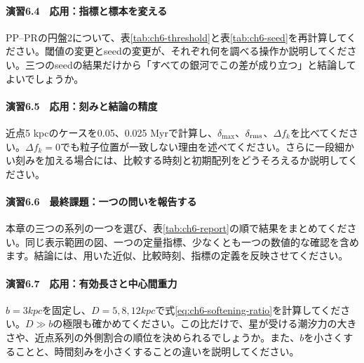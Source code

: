 \paragraph{演習6.4　応用：指標と標本を変える}
PP--PRの円盤2について、表\ref{tab:ch6-threshold}と表\ref{tab:ch6-seed}を再計算してください。閾値の変更とseedの変更が、それぞれ何を調べる操作か説明してください。三つのseedの結果だけから「すべての銀河でこの差が成り立つ」と結論してよいでしょうか。

\paragraph{演習6.5　応用：刻みと結論の精度}
近点5 kpcのケースを0.05、0.025 Myrで計算し、$\delta_{\max}$、$\delta_{\rm rms}$、$\Delta f_k$を比べてください。$\Delta f_k=0$でも粒子位置が一致しない理由を述べてください。さらに一段細かい刻みを加える場合には、比較する時刻と初期配列をどうそろえるか説明してください。

\paragraph{演習6.6　最終課題：一つの問いを報告する}
本章の三つの系列の一つを選び、表\ref{tab:ch6-report}の順で結果をまとめてください。同じ表示範囲の図、一つの定量指標、少なくとも一つの数値的な確認を含めます。結論には、用いた近似、比較時刻、指標の定義を反映させてください。

\paragraph{演習6.7　応用：有効長さと中心間重力}
$b=3\unit{kpc}$を固定し、$D=5,8,12\unit{kpc}$で式\eqref{eq:ch6-softening-ratio}を計算してください。$D\gg b$の極限も確かめてください。この比だけで、星が受ける潮汐力の大きさや、近点系列の外側割合の順位を決められるでしょうか。また、$b$を小さくすることと、時間刻みを小さくすることの違いを説明してください。
